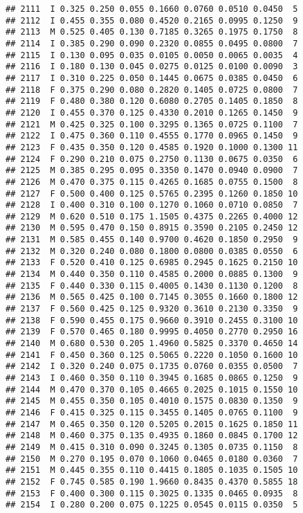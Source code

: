 \documentclass[
]{article}
\begin{document}
\begin{verbatim}
## 2111  I 0.325 0.250 0.055 0.1660 0.0760 0.0510 0.0450  5
## 2112  I 0.455 0.355 0.080 0.4520 0.2165 0.0995 0.1250  9
## 2113  M 0.525 0.405 0.130 0.7185 0.3265 0.1975 0.1750  8
## 2114  I 0.385 0.290 0.090 0.2320 0.0855 0.0495 0.0800  7
## 2115  I 0.130 0.095 0.035 0.0105 0.0050 0.0065 0.0035  4
## 2116  I 0.180 0.130 0.045 0.0275 0.0125 0.0100 0.0090  3
## 2117  I 0.310 0.225 0.050 0.1445 0.0675 0.0385 0.0450  6
## 2118  F 0.375 0.290 0.080 0.2820 0.1405 0.0725 0.0800  7
## 2119  F 0.480 0.380 0.120 0.6080 0.2705 0.1405 0.1850  8
## 2120  I 0.455 0.370 0.125 0.4330 0.2010 0.1265 0.1450  9
## 2121  M 0.425 0.325 0.100 0.3295 0.1365 0.0725 0.1100  7
## 2122  I 0.475 0.360 0.110 0.4555 0.1770 0.0965 0.1450  9
## 2123  F 0.435 0.350 0.120 0.4585 0.1920 0.1000 0.1300 11
## 2124  F 0.290 0.210 0.075 0.2750 0.1130 0.0675 0.0350  6
## 2125  M 0.385 0.295 0.095 0.3350 0.1470 0.0940 0.0900  7
## 2126  M 0.470 0.375 0.115 0.4265 0.1685 0.0755 0.1500  8
## 2127  F 0.500 0.400 0.125 0.5765 0.2395 0.1260 0.1850 10
## 2128  I 0.400 0.310 0.100 0.1270 0.1060 0.0710 0.0850  7
## 2129  M 0.620 0.510 0.175 1.1505 0.4375 0.2265 0.4000 12
## 2130  M 0.595 0.470 0.150 0.8915 0.3590 0.2105 0.2450 12
## 2131  M 0.585 0.455 0.140 0.9700 0.4620 0.1850 0.2950  9
## 2132  M 0.320 0.240 0.080 0.1800 0.0800 0.0385 0.0550  6
## 2133  F 0.520 0.410 0.125 0.6985 0.2945 0.1625 0.2150 10
## 2134  M 0.440 0.350 0.110 0.4585 0.2000 0.0885 0.1300  9
## 2135  F 0.440 0.330 0.115 0.4005 0.1430 0.1130 0.1200  8
## 2136  M 0.565 0.425 0.100 0.7145 0.3055 0.1660 0.1800 12
## 2137  F 0.560 0.425 0.125 0.9320 0.3610 0.2130 0.3350  9
## 2138  F 0.590 0.455 0.175 0.9660 0.3910 0.2455 0.3100 10
## 2139  F 0.570 0.465 0.180 0.9995 0.4050 0.2770 0.2950 16
## 2140  M 0.680 0.530 0.205 1.4960 0.5825 0.3370 0.4650 14
## 2141  F 0.450 0.360 0.125 0.5065 0.2220 0.1050 0.1600 10
## 2142  I 0.320 0.240 0.075 0.1735 0.0760 0.0355 0.0500  7
## 2143  I 0.460 0.350 0.110 0.3945 0.1685 0.0865 0.1250  9
## 2144  M 0.470 0.370 0.105 0.4665 0.2025 0.1015 0.1550 10
## 2145  M 0.455 0.350 0.105 0.4010 0.1575 0.0830 0.1350  9
## 2146  F 0.415 0.325 0.115 0.3455 0.1405 0.0765 0.1100  9
## 2147  M 0.465 0.350 0.120 0.5205 0.2015 0.1625 0.1850 11
## 2148  M 0.460 0.375 0.135 0.4935 0.1860 0.0845 0.1700 12
## 2149  M 0.415 0.310 0.090 0.3245 0.1305 0.0735 0.1150  8
## 2150  M 0.270 0.195 0.070 0.1060 0.0465 0.0180 0.0360  7
## 2151  M 0.445 0.355 0.110 0.4415 0.1805 0.1035 0.1505 10
## 2152  F 0.745 0.585 0.190 1.9660 0.8435 0.4370 0.5855 18
## 2153  F 0.400 0.300 0.115 0.3025 0.1335 0.0465 0.0935  8
## 2154  I 0.280 0.200 0.075 0.1225 0.0545 0.0115 0.0350  5

\end{verbatim}
\end{document}

